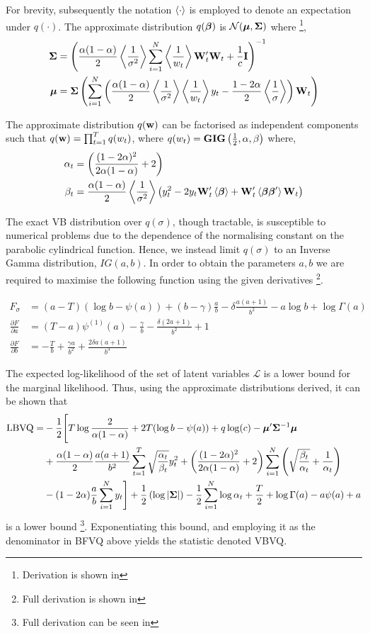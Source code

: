 \documentclass[12pt,epsf]{article}
\begin{document}
For brevity, subsequently the notation $\left\langle\cdot\right\rangle$ is employed to denote an expectation under $q(\cdot)$.
The approximate distribution $q(\bm{\beta})$ is ${\mathcal{N}}({\boldsymbol{\mu}},{\mathbf{\Sigma}})$ where \footnote{Derivation is shown in },
\begin{align}
{\mathbf{\Sigma}} &=\left(\frac{\alpha(1-\alpha)}{2}\left\langle\frac{1}{\sigma^2}\right\rangle\sum_{i=1}^{N}\left\langle\frac{1}{w_t}\right\rangle\mathbf{W}_t'\mathbf{W}_t+\frac{1}{c}\mathbf{I}\right)^{-1}\\
{\boldsymbol{\mu}}&={\mathbf{\Sigma}}\left(\sum_{i=1}^{N}\left(\frac{\alpha(1-\alpha)}{2}\left\langle\frac{1}{\sigma^2}\right\rangle\left\langle\frac{1}{w_t}\right\rangle y_t-\frac{1-2\alpha}{2}\left\langle\frac{1}{\sigma}\right\rangle\right)\mathbf{W}_t\right)
\end{align}

The approximate distribution $q(\mathbf{w})$ can be factorised as independent components such that $q(\mathbf{w})=\prod_{t=1}^{T}q(w_t)$, where
$q(w_t) = \mathbf{GIG}\left(\frac{1}{2},\alpha,\beta\right)$ where,
\begin{align}
\alpha_t & =\left(\frac{(1-2\alpha)^2}{2\alpha(1-\alpha)}+2\right) \\
\beta_t & = \frac{\alpha(1-\alpha)}{2}\left\langle\frac{1}{\sigma^2}\right\rangle\left(y_t^2-2y_t\mathbf{W}_t'\left\langle\bm{\beta}\right\rangle+\mathbf{W}_t'\left\langle\bm{\beta}\bm{\beta}'\right\rangle\mathbf{W}_t\right)
\end{align}

The exact VB distribution over $q(\sigma)$, though tractable, is susceptible to numerical problems due to the dependence of the
normalising constant on the parabolic cylindrical function. Hence, we instead limit $q(\sigma)$ to an Inverse Gamma
distribution, $IG(a,b)$. In order to obtain the parameters $a,b$ we are required to maximise the following function
using the given derivatives \footnote{Full derivation is shown in }.

\begin{align}
F_\sigma&=(a-T)(\log b-\psi(a))+(b-\gamma)\frac{a}{b}-\delta \frac{a(a+1)}{b^2}-a\log b+\log \Gamma(a)\\
\frac{\partial F}{\partial a}&=(T-a)\psi^{(1)}(a)-\frac{\gamma}{b}-\frac{\delta(2a+1)}{b^2}+1\\
\frac{\partial F}{\partial b}&=-\frac{T}{b}+\frac{\gamma a}{b^2}+\frac{2\delta a(a+1)}{b^3}
\end{align}

The expected log-likelihood of the set of latent variables $\mathcal{L}$ is a lower bound for the
marginal likelihood. Thus, using the approximate distributions derived, it can be shown that
\begin{align}
\nonumber \mbox{LBVQ} = &-\frac{1}{2}\Biggl[T\log\frac{2}{\alpha(1-\alpha)} +2T(\log b -\psi(a))+q \log (c)-{\boldsymbol{\mu}}'{\mathbf{\Sigma}}^{-1}{\boldsymbol{\mu}}\\
\nonumber&+\frac{\alpha(1-\alpha)}{2}\frac{a(a+1)}{b^2}\sum_{t=1}^{T}\sqrt{\frac{\alpha_t}{\beta_t}}y_t^2+\left(\frac{(1-2\alpha)^2}{2\alpha(1-\alpha)}+2\right)\sum_{i=1}^{N}\left(\sqrt{\frac{\beta_t}{\alpha_t}}+\frac{1}{\alpha_t}\right)\\
&-(1-2\alpha)\frac{a}{b}\sum_{i=1}^{N} y_t\Biggr]
+\frac{1}{2}\left(\log|{\mathbf{\Sigma}}|\right)-\frac{1}{2}\sum_{i=1}^{N}\log\alpha_t+\frac{T}{2}+\log \Gamma(a)-a\psi(a)+a
\end{align}
is a lower bound \footnote{Full derivation can be seen in }. Exponentiating this bound, and
employing it as the denominator in BFVQ above yields the statistic denoted VBVQ.
\end{document}
